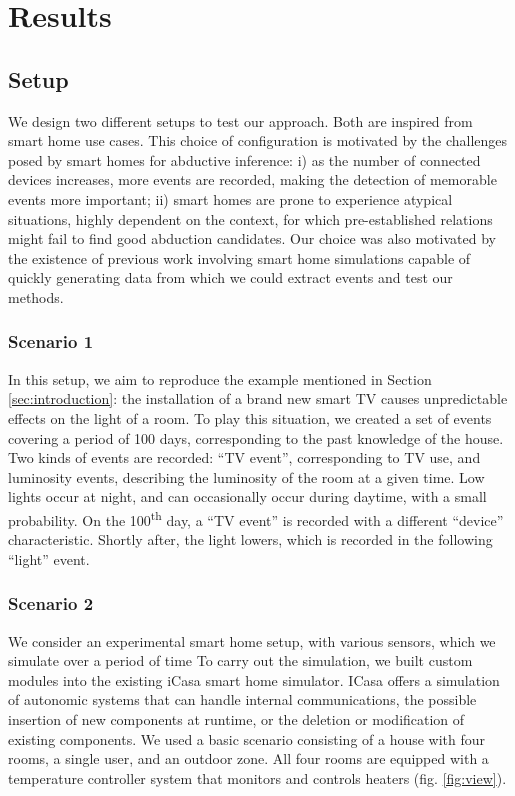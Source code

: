 \documentclass[entropy,article,submit,moreauthors,pdftex]{Definitions/mdpi}
\begin{document}
\section{Results}
\label{sec:results}
\subsection{Setup}

We design two different setups to test our approach. Both are inspired from smart home use cases.  This choice of
configuration is motivated by the challenges posed by smart homes for abductive
inference: i) as the number of connected devices increases, more events are
recorded, making the detection of memorable events more important; ii) smart
homes are prone to experience atypical situations, highly dependent on the context,
for which pre-established relations might fail to find good abduction
candidates. Our choice was also motivated by
the existence of previous work involving smart home simulations capable of quickly generating data from which we could extract events and test our methods.

\subsubsection{Scenario 1}
In this setup, we aim to reproduce the example mentioned in Section \ref{sec:introduction}: the installation of a brand new smart TV causes unpredictable effects on the light of a room.
To play this situation, we created a set of events covering a period of 100 days, corresponding to the past knowledge of the house. Two kinds of events are recorded: ``TV event'', corresponding to TV use, and luminosity events, describing the luminosity of the room at a given time. Low lights occur at night, and can occasionally occur during daytime, with a small probability. On the 100\textsuperscript{th} day, a ``TV event'' is recorded with a different ``device'' characteristic. Shortly after, the light lowers, which is recorded in the following ``light'' event.

\subsubsection{Scenario 2}
We consider an experimental smart home setup, with various sensors, which we simulate over a period of time
To carry out the simulation, we built custom modules into the existing iCasa
smart home simulator\cite{lalanda_self-aware_2017}. ICasa
offers a simulation of autonomic systems that can handle internal communications,
the possible insertion of new components at runtime, or the deletion or modification of existing
components. We used a basic scenario consisting of a house with four rooms,
a single user, and an outdoor zone. All four rooms are equipped
with a temperature controller system that monitors and controls heaters (fig.
\ref{fig:view}).
\end{document}
